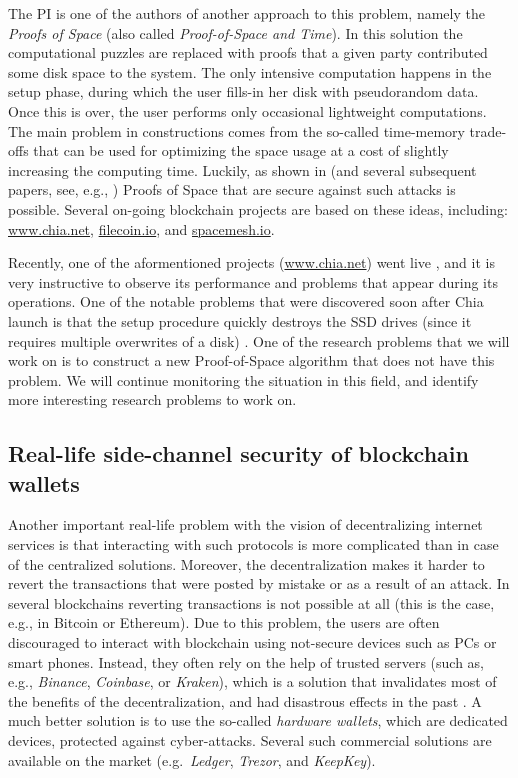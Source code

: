 \documentclass{article}
\begin{document}
The PI is one of the authors of another approach to this problem, namely the \emph{Proofs of Space} \cite{Dziembowski2015} (also called \emph{Proof-of-Space and Time}). In this solution the computational puzzles are replaced with proofs that a given party contributed some disk space to the system. The only intensive computation happens in the setup phase, during which the user fills-in her disk with pseudorandom data. Once this is over, the user performs only occasional lightweight computations. The main problem in constructions comes from the so-called time-memory trade-offs that can be used for optimizing the space usage at a cost of slightly increasing the computing time. Luckily, as shown in \cite{Dziembowski2015} (and several subsequent papers, see, e.g., \cite{Ren2016,Pietrzak2019,Moran2019,Abusalah2017}) Proofs of Space that are secure against such attacks is possible. Several on-going blockchain projects are based on these ideas, including: \url{www.chia.net}, \url{filecoin.io}, and \url{spacemesh.io}. 

Recently, one of the aformentioned projects (\url{www.chia.net}) went live \cite{Hern}, and it is very instructive to observe its performance and problems that appear during its operations. One of the notable problems that were discovered soon after Chia launch is that the setup procedure quickly destroys the SSD drives (since it requires multiple overwrites of a disk) \cite{Hern}. One of the research problems that we will work on is to construct a new Proof-of-Space algorithm that does not have this problem. We will continue monitoring the situation in this field, and identify more interesting research problems to work on.




\subsection{Real-life side-channel security of blockchain wallets}\label{sec:side-channel}


Another important real-life problem with the vision of decentralizing internet services is that interacting with such protocols is more complicated than in case of the centralized solutions. Moreover, the decentralization makes it harder to revert the transactions that were posted by mistake or as a result of an attack. In several blockchains reverting transactions is not possible at all (this is the case, e.g., in Bitcoin or Ethereum). Due to this problem, the users are often discouraged to interact with blockchain using not-secure devices such as PCs or smart phones. Instead, they often rely on the help of trusted servers (such as, e.g., \emph{Binance}, \emph{Coinbase}, or \emph{Kraken}), which is a solution that invalidates most of the benefits of the decentralization, and had disastrous effects in the past \cite{McMillan}. A much better solution is to use the so-called \emph{hardware wallets}, which are dedicated devices, protected against cyber-attacks. Several such commercial solutions are available on the market (e.g.~\emph{Ledger}, \emph{Trezor}, and \emph{KeepKey}). 
\end{document}
